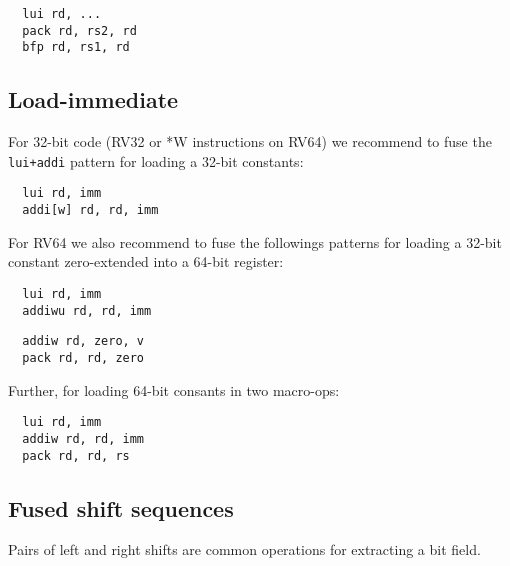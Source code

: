 \begin{minipage}{\linewidth}
\begin{verbatim}
  lui rd, ...
  pack rd, rs2, rd
  bfp rd, rs1, rd
\end{verbatim}
\end{minipage}

\subsection{Load-immediate}

For 32-bit code (RV32 or *W instructions on RV64) we recommend to fuse the {\tt
lui+addi} pattern for loading a 32-bit constants:

\begin{minipage}{\linewidth}
\begin{verbatim}
  lui rd, imm
  addi[w] rd, rd, imm
\end{verbatim}
\end{minipage}

For RV64 we also recommend to fuse the followings patterns for loading a 32-bit constant zero-extended
into a 64-bit register:

\begin{minipage}{\linewidth}
\begin{verbatim}
  lui rd, imm
  addiwu rd, rd, imm
\end{verbatim}
\end{minipage}

\begin{minipage}{\linewidth}
\begin{verbatim}
  addiw rd, zero, v
  pack rd, rd, zero
\end{verbatim}
\end{minipage}

Further, for loading 64-bit consants in two macro-ops:

\begin{minipage}{\linewidth}
\begin{verbatim}
  lui rd, imm
  addiw rd, rd, imm
  pack rd, rd, rs
\end{verbatim}
\end{minipage}

\subsection{Fused shift sequences}
\label{postfix-shift-fusion}

Pairs of left and right shifts are common operations for extracting a bit field.

